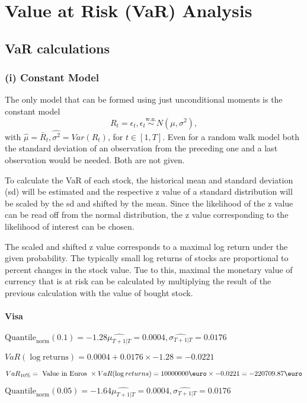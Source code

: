 \section{Value at Risk (VaR) Analysis}
\label{sec:q2_value_at_risk_analysis}
\subsection{VaR calculations}
\subsubsection{(i) Constant Model}

The only model that can be formed using just unconditional moments is the constant model $$R_t = \epsilon_t, \epsilon_t \overset{\text{w.n.}}{\sim} N(\mu, \sigma^2),$$
with $\hat \mu = \bar R_t, \hat{\sigma^2} = Var(R_t)$, for $t \in [1,T]$. 
Even for a random walk model both the standard deviation of an observation from the preceding one and a last observation would be needed. Both are not given.


To calculate the VaR of each stock, the historical mean and standard deviation (sd) will be estimated and the respective z value of a standard distribution will be scaled by the sd and shifted by the mean. 
Since the likelihood of the z value can be read off from the normal distribution, the z value corresponding to the likelihood of interest can be chosen.


The scaled and shifted z value corresponds to a maximal log return under the given probability. The typically small log returns of stocks are proportional to percent changes in the stock value. Tue to this, maximal the monetary value of currency that is at risk can be calculated by multiplying the result of the previous calculation with the value of bought stock.
\paragraph{Visa}


$\text{Quantile}_\text{norm}(0.1) = -1.28
         \hat{\mu_{T+1|T}} = 0.0004, \hat{\sigma_{T+1|T}} = 0.0176$

$VaR(\log \text{returns}) = 0.0004 + 0.0176\times-1.28 = -0.0221$

$VaR_{10\%} = \text{ Value in Euros } \times VaR(\log returns) = 10000000 \text{\euro} \times-0.0221 = -220709.87 \text{\euro}$


$\text{Quantile}_\text{norm}(0.05) = -1.64
         \hat{\mu_{T+1|T}} = 0.0004, \hat{\sigma_{T+1|T}} = 0.0176$


